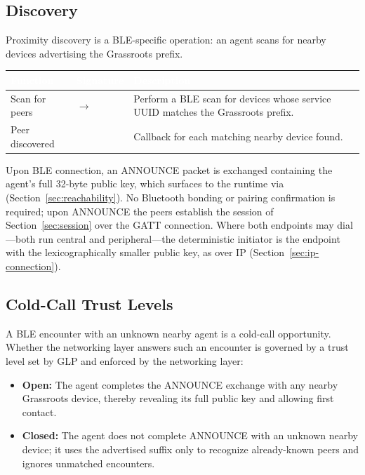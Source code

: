 \subsection{Discovery}
\label{sec:ble-discovery}
Proximity discovery is a BLE-specific operation: an agent scans for nearby devices advertising the Grassroots prefix.
\begin{longtable}{L{4cm} L{4.5cm} L{5.5cm}}
\toprule
{}
\textcolor{white}{\textbf{Function}} &
\textcolor{white}{\textbf{Signature}} &
\textcolor{white}{\textbf{Description}} \\
\midrule
\endhead
Scan for peers &  $\to$  & Perform a BLE scan for devices whose service UUID matches the Grassroots prefix. \\
Peer discovered &  & Callback for each matching nearby device found. \\
\bottomrule
\end{longtable}
Upon BLE connection, an ANNOUNCE packet is exchanged containing the agent's full 32-byte public key, which surfaces to the runtime via  (Section~\ref{sec:reachability}).  No Bluetooth bonding or pairing confirmation is required; upon ANNOUNCE the peers establish the session of Section~\ref{sec:session} over the GATT connection.  Where both endpoints may dial---both run central and peripheral---the deterministic initiator is the endpoint with the lexicographically smaller public key, as over IP (Section~\ref{sec:ip-connection}).

\subsection{Cold-Call Trust Levels}
\label{sec:ble-trust}
A BLE encounter with an unknown nearby agent is a cold-call opportunity.  Whether the networking layer answers such an encounter is governed by a trust level set by GLP and enforced by the networking layer:
\begin{itemize}
\item \textbf{Open:} The agent completes the ANNOUNCE exchange with any nearby Grassroots device, thereby revealing its full public key and allowing first contact.
\item \textbf{Closed:} The agent does not complete ANNOUNCE with an unknown nearby device; it uses the advertised suffix only to recognize already-known peers and ignores unmatched encounters.
\end{itemize}

